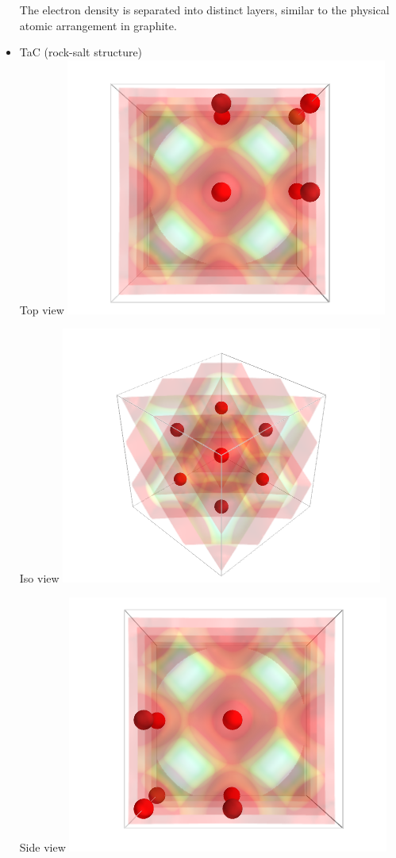 \documentclass[11pt]{article}
\begin{document}
\begin{itemize}
The electron density is separated into distinct layers, similar to the physical atomic arrangement in graphite.


\item TaC (rock-salt structure)\\
\label{sec-1-6-2-3}%
Top view
\includegraphics[width=.9\linewidth]{./images/TaC_top.png}

Iso view
\includegraphics[width=.9\linewidth]{./images/TaC_iso.png}

Side view
\includegraphics[width=.9\linewidth]{./images/TaC_side.png}


\end{itemize}
\end{document}
